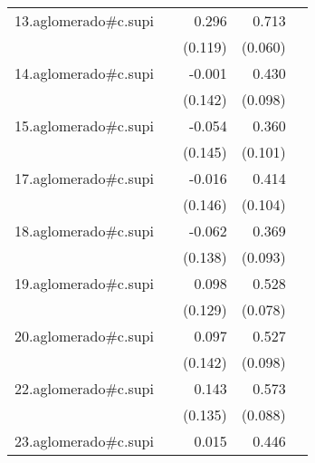 {\begin{longtable}{l*{4}{D{.}{.}{-1}}}
\addlinespace
13.aglomerado#c.supi&                     &       0.296\sym{*}  &       0.713\sym{***}&                     \\
            &                     &     (0.119)         &     (0.060)         &                     \\
\addlinespace
14.aglomerado#c.supi&                     &      -0.001         &       0.430\sym{***}&                     \\
            &                     &     (0.142)         &     (0.098)         &                     \\
\addlinespace
15.aglomerado#c.supi&                     &      -0.054         &       0.360\sym{***}&                     \\
            &                     &     (0.145)         &     (0.101)         &                     \\
\addlinespace
17.aglomerado#c.supi&                     &      -0.016         &       0.414\sym{***}&                     \\
            &                     &     (0.146)         &     (0.104)         &                     \\
\addlinespace
18.aglomerado#c.supi&                     &      -0.062         &       0.369\sym{***}&                     \\
            &                     &     (0.138)         &     (0.093)         &                     \\
\addlinespace
19.aglomerado#c.supi&                     &       0.098         &       0.528\sym{***}&                     \\
            &                     &     (0.129)         &     (0.078)         &                     \\
\addlinespace
20.aglomerado#c.supi&                     &       0.097         &       0.527\sym{***}&                     \\
            &                     &     (0.142)         &     (0.098)         &                     \\
\addlinespace
22.aglomerado#c.supi&                     &       0.143         &       0.573\sym{***}&                     \\
            &                     &     (0.135)         &     (0.088)         &                     \\
\addlinespace
23.aglomerado#c.supi&                     &       0.015         &       0.446\sym{***}&                     \\

\end{longtable}}
